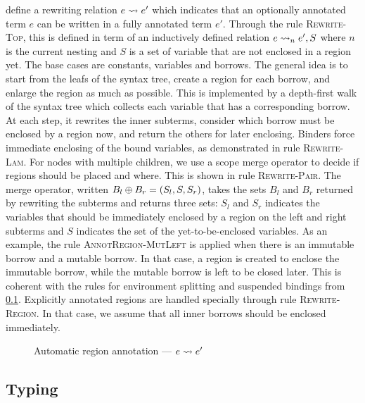  define a rewriting relation $e \rightsquigarrow e'$
which indicates that an optionally annotated term $e$ can be written
in a fully annotated term $e'$.
Through the rule \textsc{Rewrite-Top}, this is defined
in term of an inductively defined relation
$e \rightsquigarrow_{n} e', S$ where $n$ is the current nesting and $S$ is a set of
variable that are not enclosed in a region yet.
The base cases are constants, variables and borrows.
The general idea is to start from the leafs of the syntax tree, create a
region for each borrow, and enlarge the region as much as possible.
This is implemented by a depth-first walk of the syntax
tree which collects each variable that has a corresponding borrow.
At each step, it rewrites the inner subterms,
consider which borrow must be enclosed by a region now, and
return the others for later enclosing. Binders force immediate
enclosing of the bound variables, as demonstrated in rule \textsc{Rewrite-Lam}.
For nodes with multiple children, we
use a scope merge operator to decide if regions should be placed and where.
This is shown in rule \textsc{Rewrite-Pair}.
The merge operator, written $B_l \oplus B_r = (S_l,S,S_r)$, takes
the sets $B_l$ and $B_r$ returned by rewriting the subterms
and returns three sets: $S_l$ and $S_r$ indicates the variables
that should be immediately enclosed by a region on the left and right
subterms and $S$ indicates the set of the yet-to-be-enclosed variables.
As an example, the rule \textsc{AnnotRegion-MutLeft} is applied
when there is an immutable borrow and a mutable borrow. In that case, a
region is created to enclose the immutable borrow, while the mutable
borrow is left to be closed later. This is coherent with the rules
for environment splitting and suspended bindings from \cref{sdtyping}.
%
Explicitly annotated regions are handled specially through
rule \textsc{Rewrite-Region}. In that case, we assume that all inner
borrows should be enclosed immediately.

\begin{figure*}[!hbt]
  \centering
  
  \caption{Automatic region annotation --- $e \rightsquigarrow e'$}
  \label{fig:region-annotation}
\end{figure*}

\clearpage
\subsection{Typing}
\label{sdtyping}

